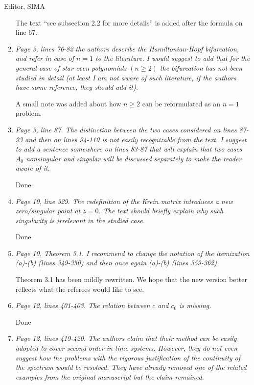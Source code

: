 \documentclass[11pt]{letter}
\begin{document}
\begin{letter}{Editor, SIMA}
\begin{enumerate}
The text ``see subsection 2.2 for more details'' is added after the formula on line 67.

\item \emph{Page 3, lines 76-82 the authors describe the Hamiltonian-Hopf bifurcation, and refer in case of $n = 1$ to the literature. I would suggest to add that for the general case of star-even polynomials $(n \geq 2)$ the bifurcation has not been studied in detail (at least I am not aware of such literature, if the authors have some reference, they should add it).}
\vspace{4mm}

A small note was added about how $n\ge2$ can be reformulated as an $n=1$ problem.

\item \emph{Page 3, line 87. The distinction between the two cases considered on lines 87-93 and then on lines 94-110 is not easily recognizable from the text. I suggest to add a sentence somewhere on lines 83-87 that will explain that two cases $A_0$ nonsingular and singular will be discussed separately to make the reader aware of it.}
\vspace{4mm}

Done.

\item \emph{Page 10, line 329. The redefinition of the Krein matrix introduces a new zero/singular point at $z = 0$. The text should briefly explain why such singularity is irrelevant in the studied case.}
\vspace{4mm}

Done.

\item \emph{Page 10, Theorem 3.1. I recommend to change the notation of the itemization (a)-(b) (lines 349-350) and then once again (a)-(b) (lines 359-362).}
\vspace{4mm}

Theorem 3.1 has been mildly rewritten.  We hope that the new version better reflects what the referees would like to see.

\item \emph{Page 12, lines 401-403. The relation between $c$ and $c_0$ is missing.}
\vspace{4mm}

Done

\item \emph{Page 12, lines 419-420. The authors claim that their method can be easily adopted to cover second-order-in-time systems. However, they do not even suggest how the problems with the rigorous justification of the continuity of the spectrum would be resolved. They have already removed one of the related examples from the original manuscript but the claim remained.}
\vspace{4mm}


\end{enumerate}
\end{letter}
\end{document}
